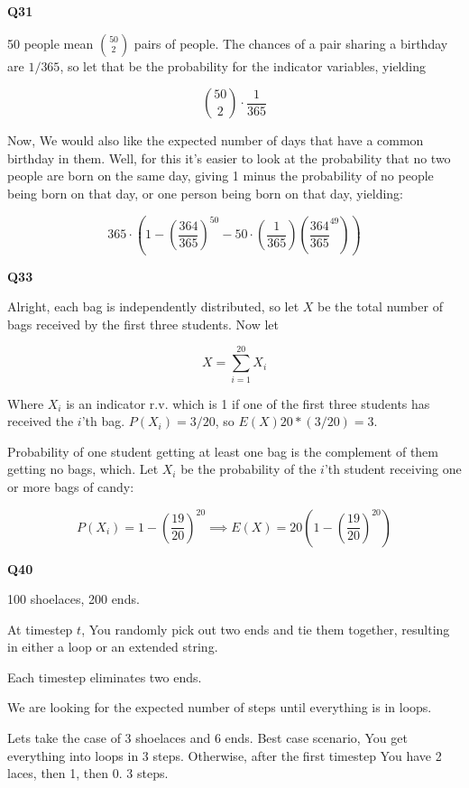 \documentclass{article}
\begin{document}
		\textbf{Q31}
		
		50 people mean ${50 \choose 2}$ pairs of people. The chances of a pair sharing a birthday are $1/365$, so let that be the probability for the indicator variables, yielding
		
		\[ {50\choose 2}\cdot\frac{1}{365}\]
		
		Now, We would also like the expected number of days that have a common birthday in them. Well, for this it's easier to look at the probability that no two people are born on the same day, giving 1 minus the probability of no people being born on that day, or one person being born on that day, yielding:
		
		\[ 365\cdot\left( 1 - \left( \frac{364}{365}\right)^{50} - 50\cdot\left(\frac{1}{365}\right)\left(\frac{364}{365}^{49} \right) \right) \]

		\hfill
				
		\textbf{Q33}
		
		Alright, each bag is independently distributed, so let $X$ be the total number of bags received by the first three students. Now let
		
		\[ X = \sum^{20}_{i=1} X_i \]
		
		Where $X_i$ is an indicator r.v. which is 1 if one of the first three students has received the $i$'th bag.	$P(X_i) = 3/20$, so $E(X) 20 * (3/20) = 3$.
		
		Probability of one student getting at least one bag is the complement of them getting no bags, which. Let $X_i$ be the probability of the $i$'th student receiving one or more bags of candy: 
		
		\[ P(X_i) = 1-\left(\frac{19}{20}\right)^{20} \implies E(X) = 20\left(1-\left(\frac{19}{20}\right)^{20}\right)\]
		
		\hfill
		
		\textbf{Q40}
		
		100 shoelaces, 200 ends. 
		
		At timestep $t$, You randomly pick out two ends and tie them together, resulting in either a loop or an extended string. 
		
		Each timestep eliminates two ends.		
		
		We are looking for the expected number of steps until everything is in loops.
		
		Lets take the case of 3 shoelaces and 6 ends. Best case scenario, You get everything into loops in 3 steps. Otherwise, after the first timestep You have 2 laces, then 1, then 0. 3 steps. 
		
\end{document}
